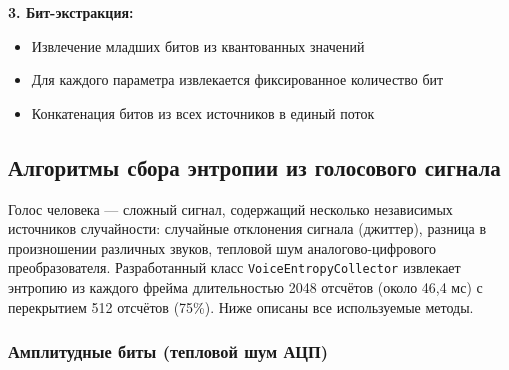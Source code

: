 \documentclass[14pt, a4paper]{extreport}
\begin{document}
\textbf{3. Бит-экстракция:}
\begin{itemize}
    \item Извлечение младших битов из квантованных значений
    \item Для каждого параметра извлекается фиксированное количество бит
    \item Конкатенация битов из всех источников в единый поток
\end{itemize}

\begin{table}[H]
\centering
\caption{Параметры извлечения энтропии из различных источников}
\label{tab:entropy_sources}
\end{table}
\subsection{Алгоритмы сбора энтропии из голосового сигнала}

Голос человека — сложный сигнал, содержащий несколько независимых источников случайности: случайные отклонения сигнала (джиттер), разница в произношении различных звуков, тепловой шум аналогово-цифрового преобразователя. Разработанный класс \texttt{VoiceEntropyCollector} извлекает энтропию из каждого фрейма длительностью 2048 отсчётов (около 46,4 мс) с перекрытием 512 отсчётов (75\%). Ниже описаны все используемые методы.

\subsubsection{Амплитудные биты (тепловой шум АЦП)}
\end{document}
